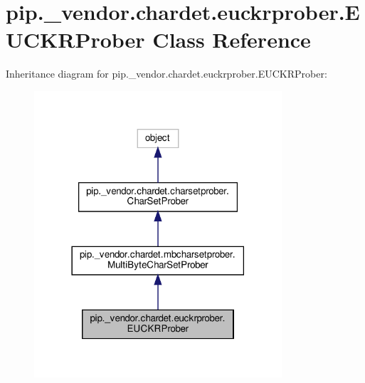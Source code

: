 \hypertarget{classpip_1_1__vendor_1_1chardet_1_1euckrprober_1_1EUCKRProber}{}\section{pip.\+\_\+vendor.\+chardet.\+euckrprober.\+E\+U\+C\+K\+R\+Prober Class Reference}
\label{classpip_1_1__vendor_1_1chardet_1_1euckrprober_1_1EUCKRProber}


Inheritance diagram for pip.\+\_\+vendor.\+chardet.\+euckrprober.\+E\+U\+C\+K\+R\+Prober\+:
\nopagebreak
\begin{figure}[H]
\begin{center}
\leavevmode
\includegraphics[width=261pt]{classpip_1_1__vendor_1_1chardet_1_1euckrprober_1_1EUCKRProber__inherit__graph}
\end{center}
\end{figure}


